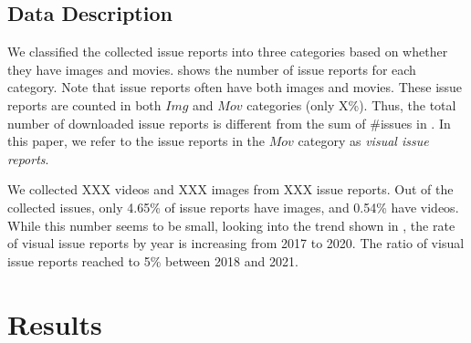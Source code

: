 





\newpage
\subsection{Data Description}

We classified the collected issue reports into three categories based on whether they have images and movies.  shows the number of issue reports for each category. 
Note that issue reports often have both images and movies. 
These issue reports are counted in both $Img$ and $Mov$ categories (only X\%). 
Thus, the total number of downloaded issue reports is different from the sum of \#issues in . 
In this paper, we refer to the issue reports in the $Mov$ category 
as \textit{visual issue reports}. 


We collected XXX videos and XXX images from XXX issue reports. Out of the collected issues, only 4.65\% of issue reports have images, and 0.54\% have videos. While this number seems to be small, looking into the trend shown in , the rate of visual issue reports by year is increasing from 2017 to 2020. The ratio of visual issue reports reached to 5\% between 2018 and 2021.


\section{Results}
\label{sec:results}

% 

